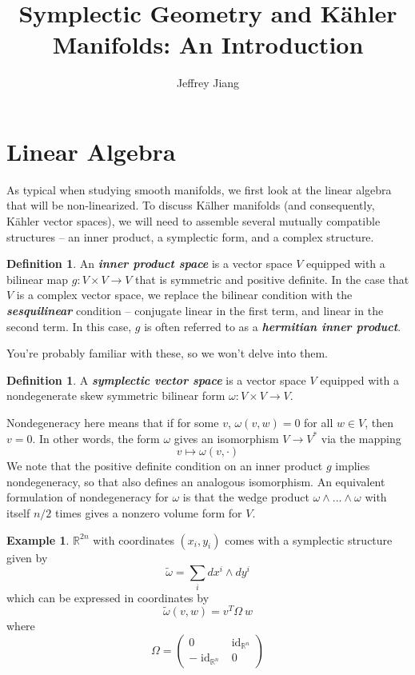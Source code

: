 \documentclass[psamsfonts]{amsart}
\theoremstyle{definition}
\newtheorem{defn}[thm]{Definition}
\newtheorem{exmp}[thm]{Example}
\theoremstyle{remark}
\newcommand{\R}{\mathbb{R}}
\newcommand{\ib}[1]{\textbf{\textit{#1}}}
\DeclareMathOperator{\id}{id}
\begin{document}
\author{Jeffrey Jiang}
\title{Symplectic Geometry and K\"ahler Manifolds: An Introduction}
%
\maketitle
%
\section*{Linear Algebra}
%
As typical when studying smooth manifolds, we first look at the linear algebra that will be non-linearized. To discuss K\"alher manifolds (and consequently, K\"ahler vector spaces), we will need to assemble several mutually compatible structures -- an inner product, a symplectic form, and a complex structure. 
%
\begin{defn}
An \ib{inner product space} is a vector space $V$ equipped with a bilinear map $g: V\times V \to V$ that is symmetric and positive definite. In the case that $V$ is a complex vector space, we replace the bilinear condition with the \ib{sesquilinear} condition -- conjugate linear in the first term, and linear in the second term. In this case, $g$ is often referred to as a \ib{hermitian inner product}.
\end{defn}
You're probably familiar with these, so we won't delve into them.
%
\begin{defn}
A \ib{symplectic vector space} is a vector space $V$ equipped with a nondegenerate skew symmetric bilinear form $\omega : V \times V \to V$.
\end{defn}
%
Nondegeneracy here means that if for some $v$, $\omega(v,w) = 0$ for all $w \in V$, then $v = 0$.  In other words, the form $\omega$ gives an isomorphism $V \to V^*$ via the mapping
$$v \mapsto \omega(v,\cdot) $$
We note that the positive definite condition on an inner product $g$ implies nondegeneracy, so that also defines an analogous isomorphism. An equivalent formulation of nondegeneracy for $\omega$ is that the wedge product $\omega \wedge \ldots \wedge \omega$ with itself $n/2$ times gives a nonzero volume form for $V$.
\begin{exmp}
$\R^{2n}$ with coordinates $(x_i,y_i)$ comes with a symplectic structure given by
$$\tilde{\omega} = \sum_i dx^i \wedge dy^i  $$
which can be expressed in coordinates by 
$$\tilde{\omega}(v,w) = v^T \Omega ~w $$
where 
$$\Omega =  \begin{pmatrix}
0 & \id_{\R^n} \\
-\id_{\R^n} & 0
\end{pmatrix} $$
\end{exmp}
\end{document}
